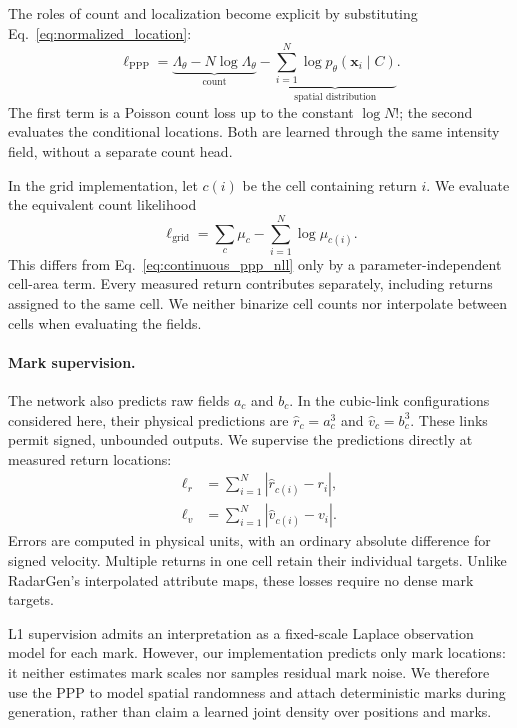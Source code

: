 The roles of count and localization become explicit by substituting Eq.~\eqref{eq:normalized_location}:
\begin{equation}
\ell_{\mathrm{PPP}}
=\underbrace{\Lambda_\theta-N\log\Lambda_\theta}_{\text{count}}
-\underbrace{\sum_{i=1}^{N}\log p_\theta(\mathbf{x}_i\mid C)}_{\text{spatial distribution}}.
\label{eq:count_spatial_decomposition}
\end{equation}
The first term is a Poisson count loss up to the constant $\log N!$; the second evaluates the conditional locations.
Both are learned through the same intensity field, without a separate count head.

In the grid implementation, let $c(i)$ be the cell containing return $i$.
We evaluate the equivalent count likelihood
\begin{equation}
\ell_{\mathrm{grid}}
=\sum_c\mu_c-\sum_{i=1}^{N}\log\mu_{c(i)}.
\label{eq:ppp_nll}
\end{equation}
This differs from Eq.~\eqref{eq:continuous_ppp_nll} only by a parameter-independent cell-area term.
Every measured return contributes separately, including returns assigned to the same cell.
We neither binarize cell counts nor interpolate between cells when evaluating the fields.

\paragraph{Mark supervision.}
The network also predicts raw fields $a_c$ and $b_c$.
In the cubic-link configurations considered here, their physical predictions are $\widehat r_c=a_c^3$ and $\widehat v_c=b_c^3$.
These links permit signed, unbounded outputs.
We supervise the predictions directly at measured return locations:
\begin{equation}
\begin{aligned}
\ell_r&=\sum_{i=1}^{N}|\widehat r_{c(i)}-r_i|,\\
\ell_v&=\sum_{i=1}^{N}|\widehat v_{c(i)}-v_i|.
\end{aligned}
\label{eq:mark_losses}
\end{equation}
Errors are computed in physical units, with an ordinary absolute difference for signed velocity.
Multiple returns in one cell retain their individual targets.
Unlike RadarGen's interpolated attribute maps, these losses require no dense mark targets.

L1 supervision admits an interpretation as a fixed-scale Laplace observation model for each mark.
However, our implementation predicts only mark locations: it neither estimates mark scales nor samples residual mark noise.
We therefore use the PPP to model spatial randomness and attach deterministic marks during generation, rather than claim a learned joint density over positions and marks.


